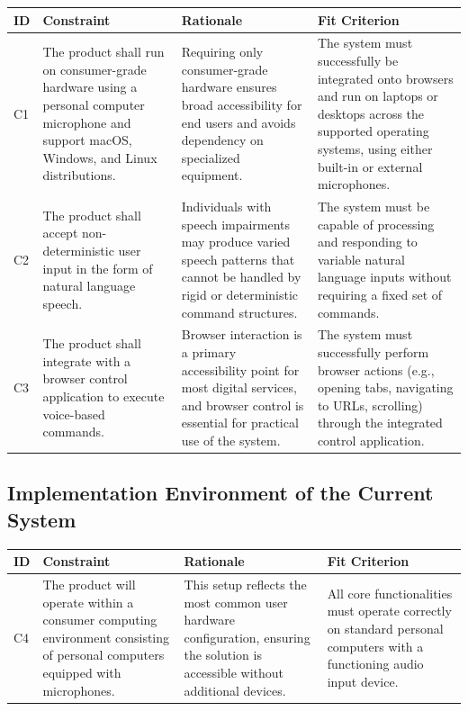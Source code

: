 \documentclass[11pt]{article}
\begin{document}
\begin{tabularx}{\textwidth}{p{1cm}X X X}
\toprule
\textbf{ID} & \textbf{Constraint} & \textbf{Rationale} & \textbf{Fit Criterion} \\
\midrule
C1 & The product shall run on consumer-grade hardware using a personal computer microphone and support macOS, Windows, and Linux distributions. & Requiring only consumer-grade hardware ensures broad accessibility for end users and avoids dependency on specialized equipment. & The system must successfully be integrated onto browsers and run on laptops or desktops across the supported operating systems, using either built-in or external microphones. \\
\hline
C2 & The product shall accept non-deterministic user input in the form of natural language speech. & Individuals with speech impairments may produce varied speech patterns that cannot be handled by rigid or deterministic command structures. & The system must be capable of processing and responding to variable natural language inputs without requiring a fixed set of commands. \\
\hline
C3 & The product shall integrate with a browser control application to execute voice-based commands. & Browser interaction is a primary accessibility point for most digital services, and browser control is essential for practical use of the system. & The system must successfully perform browser actions (e.g., opening tabs, navigating to URLs, scrolling) through the integrated control application. \\
\bottomrule
\end{tabularx}


\subsection{Implementation Environment of the Current System}


\begin{tabularx}{\textwidth}{p{1cm}X X X}
\toprule
\textbf{ID} & \textbf{Constraint} & \textbf{Rationale} & \textbf{Fit Criterion} \\
\midrule
C4 & The product will operate within a consumer computing environment consisting of personal computers equipped with microphones. & This setup reflects the most common user hardware configuration, ensuring the solution is accessible without additional devices. & All core functionalities must operate correctly on standard personal computers with a functioning audio input device. \\
\bottomrule
\end{tabularx}
\end{document}
